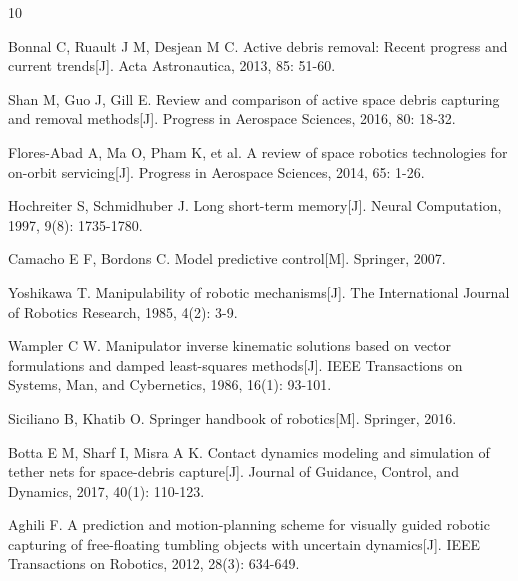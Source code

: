 \documentclass[12pt,a4paper]{ctexart}
\begin{document}
\begin{thebibliography}{10}

Bonnal C, Ruault J M, Desjean M C. Active debris removal: Recent progress and current trends[J]. Acta Astronautica, 2013, 85: 51-60.

Shan M, Guo J, Gill E. Review and comparison of active space debris capturing and removal methods[J]. Progress in Aerospace Sciences, 2016, 80: 18-32.

Flores-Abad A, Ma O, Pham K, et al. A review of space robotics technologies for on-orbit servicing[J]. Progress in Aerospace Sciences, 2014, 65: 1-26.

Hochreiter S, Schmidhuber J. Long short-term memory[J]. Neural Computation, 1997, 9(8): 1735-1780.

Camacho E F, Bordons C. Model predictive control[M]. Springer, 2007.

Yoshikawa T. Manipulability of robotic mechanisms[J]. The International Journal of Robotics Research, 1985, 4(2): 3-9.

Wampler C W. Manipulator inverse kinematic solutions based on vector formulations and damped least-squares methods[J]. IEEE Transactions on Systems, Man, and Cybernetics, 1986, 16(1): 93-101.

Siciliano B, Khatib O. Springer handbook of robotics[M]. Springer, 2016.

Botta E M, Sharf I, Misra A K. Contact dynamics modeling and simulation of tether nets for space-debris capture[J]. Journal of Guidance, Control, and Dynamics, 2017, 40(1): 110-123.

Aghili F. A prediction and motion-planning scheme for visually guided robotic capturing of free-floating tumbling objects with uncertain dynamics[J]. IEEE Transactions on Robotics, 2012, 28(3): 634-649.

\end{thebibliography}
\end{document}
